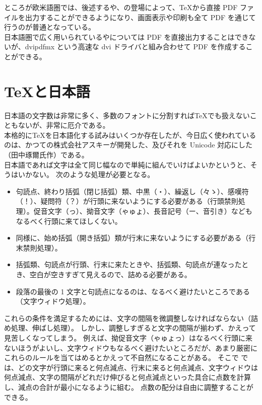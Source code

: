 ところが欧米語圏では、後述する\pdfTeX{}や\XeTeX{}、\LuaTeX{}の登場によって、\TeX{}から直接 PDF ファイルを出力することができるようになり、画面表示や印刷も全て PDF を通じて行うのが普通となっている。\\

日本語圏で広く用いられている\pTeX{}や\upTeX{}については PDF を直接出力することはできないが、dvipdfmx という高速な dvi ドライバと組み合わせて PDF を作成することができる。
\section{\TeX{}と日本語}
日本語の文字数は非常に多く、多数のフォントに分割すれば\TeX{}でも扱えないこともないが、非常に厄介である。\\

本格的に\TeX{}を日本語化する試みはいくつか存在したが、今日広く使われているのは、かつての株式会社アスキーが開発した、及びそれを Unicode 対応にした\upTeX（田中琢爾{\small 氏}作）である。\\

日本語であれば文字は全て同じ幅なので単純に組んでいけばよいかというと、そうはいかない。
次のような処理が必要となる。
\begin{itemize}\setlength{\leftskip}{-1.00zw}%
\item 句読点、終わり括弧（閉じ括弧）類、中黒（・）、繰返し（々ゝ）、感嘆符（！）、疑問符（？）が行頭に来ないようにする必要がある（行頭禁則処理）。促音文字（っ）、拗音文字（ゃゅょ）、長音記号（ー、音引き）などもなるべく行頭に来てほしくない。
\item 同様に、始め括弧（開き括弧）類が行末に来ないようにする必要がある（行末禁則処理）。
\item 括弧類、句読点が行頭、行末に来たときや、括弧類、句読点が連なったとき、空白が空きすぎて見えるので、詰める必要がある。
\item 段落の最後の 1 文字と句読点になるのは、なるべく避けたいところである（文字ウィドウ処理）。
\end{itemize}
これらの条件を満足するためには、文字の間隔を微調整しなければならない（詰め処理、伸ばし処理）。
しかし、調整しすぎると文字の間隔が揃わず、かえって見苦しくなってしまう。
例えば、拗促音文字（ゃゅょっ）はなるべく行頭に来ないほうがよいし、文字ウィドウもなるべく避けたいところだが、あまり厳密にこれらのルールを当てはめるとかえって不自然になることがある。
そこで \pTeX{}では、どの文字が行頭に来ると何点減点、行末に来ると何点減点、文字ウィドウは何点減点、文字の間隔がどれだけ伸びると何点減点といった具合に点数を計算し、減点の合計が最小になるように組む。
点数の配分は自由に調整することができる。\\


